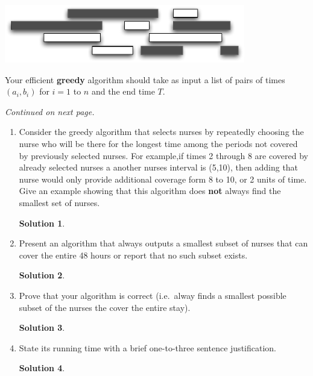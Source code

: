 \documentclass[11pt]{article}
\theoremstyle{definition}
\newtheorem*{solution}{Solution}
\begin{document}
\begin{enumerate}
\begin{center}
	\includegraphics[height=1in]{subcover}
\end{center}

Your efficient {\bf greedy} algorithm should take as input a list of pairs of times $(a_i,b_i)$ for $i=1$ to $n$ and the end time $T$.

\textit{Continued on next page.}
\newpage
\begin{enumerate}
	\item Consider the greedy algorithm that selects nurses by
	repeatedly choosing the nurse who will be there for the longest
	time among the periods not covered by previously selected
	nurses. For example,if times 2 through 8 are covered by already selected nurses a another nurses interval is (5,10),
	then adding that nurse would only provide additional coverage form 8 to 10, or 2 units of time. 
	Give an example showing that this algorithm does \textbf{not}
	always find the smallest set of nurses.
	\begin{solution}
	
	\end{solution}
	\newpage
	\item Present an algorithm that always outputs a smallest subset of nurses that can cover the entire 48 hours 
	or report that no such subset exists.
	\begin{solution}
	
	\end{solution}
	\newpage
	\item Prove that your algorithm is correct (i.e.\ alway finds a smallest possible subset of the nurses the cover the entire stay).
	\begin{solution}
	
	\end{solution}
	\newpage
	\item State its running time with a brief one-to-three sentence justification. 
	\begin{solution}
	

\end{solution}
\end{enumerate}
\end{enumerate}
\end{document}

